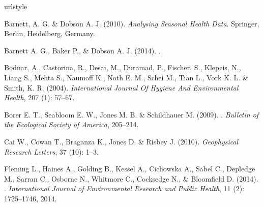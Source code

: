 \documentclass[11pt,a4paper]{article}
\begin{document}
\begin{thebibliography}{30}
\providecommand{\natexlab}[1]{#1}
\providecommand{\url}[1]{\texttt{#1}}
\expandafter\ifx\csname urlstyle\endcsname\relax
  \providecommand{\doi}[1]{doi: #1}\else
  \providecommand{\doi}{doi: \begingroup \urlstyle{rm}\Url}\fi

Barnett, A. G.  \& Dobson A. J. (2010).
\newblock \emph{{Analysing Seasonal Health Data}}.
\newblock Springer, Berlin, Heidelberg, Germany.

Barnett A. G.,  Baker P., \&  Dobson A. J. (2014).
.

Bodnar, A., Castorina, R., Desai, M., Duramad, P., Fischer, S., Klepeis, N., Liang S., Mehta S., Naumoff K., Noth E. M., Schei M., Tian L., Vork K. L. \& Smith, K. R. (2004).
\newblock \emph{International Journal Of Hygiene And Environmental Health},
  207 (1): 57--67.


Borer E. T., Seabloom E. W., Jones M. B. \& Schildhauer M. (2009).
.
\newblock \emph{Bulletin of the Ecological Society of America}, 
   205--214.

Cai W., Cowan T., Braganza K., Jones D. \& Risbey J. (2010).
\newblock \emph{Geophysical Research Letters}, 37 (10): 1--3.


  Fleming L., Haines A., Golding B., Kessel A., Cichowska A., 
  Sabel C., Depledge M., Sarran C., Osborne N., Whitmore C.,
  Cocksedge N., \& Bloomfield D. (2014).
.
\newblock \emph{International Journal of Environmental Research and Public
  Health}, 11 (2): 1725--1746, 2014.



\end{thebibliography}
\end{document}

